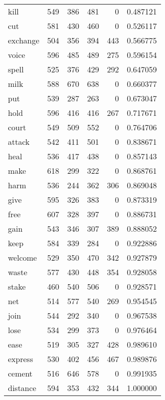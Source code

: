 \begin{tabular}{lrrrrr}
kill      &  549 &   386 &  481 &    0 &      0.487121 \\
cut       &  581 &   430 &  460 &    0 &      0.526117 \\
exchange  &  504 &   356 &  394 &  443 &      0.566775 \\
voice     &  596 &   485 &  489 &  275 &      0.596154 \\
spell     &  525 &   376 &  429 &  292 &      0.647059 \\
milk      &  588 &   670 &  638 &    0 &      0.660377 \\
put       &  539 &   287 &  263 &    0 &      0.673047 \\
hold      &  596 &   416 &  416 &  267 &      0.717671 \\
court     &  549 &   509 &  552 &    0 &      0.764706 \\
attack    &  542 &   411 &  501 &    0 &      0.838671 \\
heal      &  536 &   417 &  438 &    0 &      0.857143 \\
make      &  618 &   299 &  322 &    0 &      0.868761 \\
harm      &  536 &   244 &  362 &  306 &      0.869048 \\
give      &  595 &   326 &  383 &    0 &      0.873319 \\
free      &  607 &   328 &  397 &    0 &      0.886731 \\
gain      &  543 &   346 &  307 &  389 &      0.888052 \\
keep      &  584 &   339 &  284 &    0 &      0.922886 \\
welcome   &  529 &   350 &  470 &  342 &      0.927879 \\
waste     &  577 &   430 &  448 &  354 &      0.928058 \\
stake     &  460 &   540 &  506 &    0 &      0.928571 \\
net       &  514 &   577 &  540 &  269 &      0.954545 \\
join      &  544 &   292 &  340 &    0 &      0.967538 \\
lose      &  534 &   299 &  373 &    0 &      0.976464 \\
ease      &  519 &   305 &  327 &  428 &      0.989610 \\
express   &  530 &   402 &  456 &  467 &      0.989876 \\
cement    &  516 &   646 &  578 &    0 &      0.991935 \\
distance  &  594 &   353 &  432 &  344 &      1.000000 \\
\bottomrule
\end{tabular}
